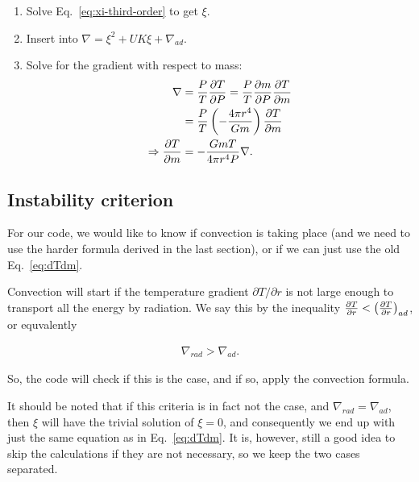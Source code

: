 \documentclass[11pt,twocolumn]{article}
\begin{document}
\begin{enumerate}
    \item Solve Eq.~\eqref{eq:xi-third-order} to get $\xi$.
    \item Insert into $\nabla = \xi^2 + UK\xi + \nabla_{ad}$.
    \item Solve for the gradient with respect to mass:
    \begin{align}
        \nabla &= \frac{P}{T}\frac{\partial T}{\partial P} = \frac{P}{T}\frac{\partial m}{\partial P}\frac{\partial T}{\partial m}\\
        &= \frac{P}{T} \left(- \frac{4\pi r^4}{Gm}\right) \frac{\partial T}{\partial m}\\
        \Rightarrow \frac{\partial T}{\partial m} &= -\frac{GmT}{4\pi r^4 P}\nabla.
    \end{align}
\end{enumerate}

\subsection{Instability criterion}
\label{sub:Instability criterion}

For our code, we would like to know if convection is taking place (and we need to use the harder formula derived in the last section), or if we can just use the old Eq.~\eqref{eq:dTdm}.

Convection will start if the temperature gradient $\partial T/\partial r$ is not large enough to transport all the energy by radiation. We say this by the inequality $\frac{\partial T}{\partial r} < \left(\frac{\partial T}{\partial r}\right)_{ad}$, or equvalently

\begin{align}
    \nabla_{rad} > \nabla_{ad}\label{eq:instability-criterion}.
\end{align}


So, the code will check if this is the case, and if so, apply the convection formula.

It should be noted that if this criteria is in fact not the case, and $\nabla_{rad} = \nabla_{ad}$, then $\xi$ will have the trivial solution of $\xi=0$, and consequently we end up with just the same equation as in Eq.~\eqref{eq:dTdm}. It is, however, still a good idea to skip the calculations if they are not necessary, so we keep the two cases separated.
\end{document}
